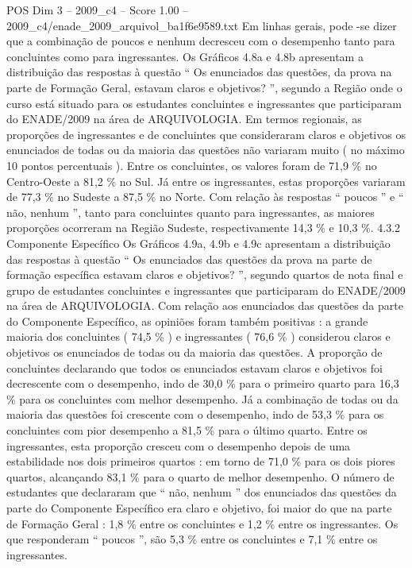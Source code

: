 \begin{textsample}{POS Dim 3 – 2009\_c4 – Score 1.00 – 2009\_c4/enade\_2009\_arquivol\_ba1f6e9589.txt}
Em linhas gerais, pode -se dizer que a combinação de poucos e nenhum decresceu com o desempenho tanto para concluintes como para ingressantes.
Os Gráficos 4.8a e 4.8b apresentam a distribuição das respostas à questão “ Os enunciados das questões, da prova na parte de Formação Geral, estavam claros e objetivos? ”, segundo a Região onde o curso está situado para os estudantes concluintes e ingressantes que participaram do ENADE/2009 na área de ARQUIVOLOGIA.
Em termos regionais, as proporções de ingressantes e de concluintes que consideraram claros e objetivos os enunciados de todas ou da maioria das questões não variaram muito ( no máximo 10 pontos percentuais ).
Entre os concluintes, os valores foram de 71,9 \% no Centro-Oeste a 81,2 \% no Sul.
Já entre os ingressantes, estas proporções variaram de 77,3 \% no Sudeste a 87,5 \% no Norte.
Com relação às respostas “ poucos ” e “ não, nenhum ”, tanto para concluintes quanto para ingressantes, as maiores proporções ocorreram na Região Sudeste, respectivamente 14,3 \% e 10,3 \%. 4.3.2 Componente Específico Os Gráficos 4.9a, 4.9b e 4.9c apresentam a distribuição das respostas à questão “ Os enunciados das questões da prova na parte de formação específica estavam claros e objetivos? ”, segundo quartos de nota final e grupo de estudantes concluintes e ingressantes que participaram do ENADE/2009 na área de ARQUIVOLOGIA.
Com relação aos enunciados das questões da parte do Componente Específico, as opiniões foram também positivas : a grande maioria dos concluintes ( 74,5 \% ) e ingressantes ( 76,6 \% ) considerou claros e objetivos os enunciados de todas ou da maioria das questões.
A proporção de concluintes declarando que todos os enunciados estavam claros e objetivos foi decrescente com o desempenho, indo de 30,0 \% para o primeiro quarto para 16,3 \% para os concluintes com melhor desempenho.
Já a combinação de todas ou da maioria das questões foi crescente com o desempenho, indo de 53,3 \% para os concluintes com pior desempenho a 81,5 \% para o último quarto.
Entre os ingressantes, esta proporção cresceu com o desempenho depois de uma estabilidade nos dois primeiros quartos : em torno de 71,0 \% para os dois piores quartos, alcançando 83,1 \% para o quarto de melhor desempenho.
O número de estudantes que declararam que “ não, nenhum ” dos enunciados das questões da parte do Componente Específico era claro e objetivo, foi maior do que na parte de Formação Geral : 1,8 \% entre os concluintes e 1,2 \% entre os ingressantes.
Os que responderam “ poucos ”, são 5,3 \% entre os concluintes e 7,1 \% entre os ingressantes.

\end{textsample}
